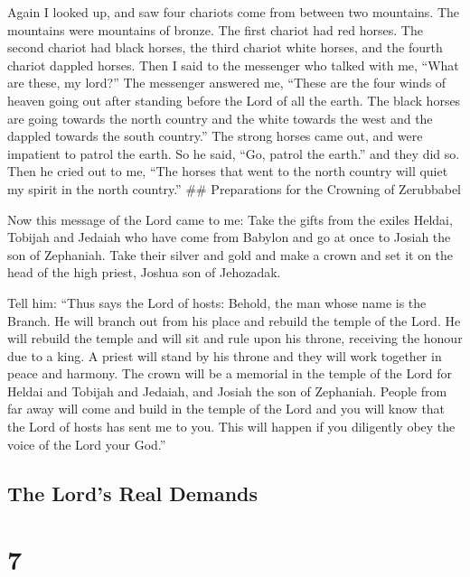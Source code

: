  Again I looked up, and saw four chariots come from between
two mountains. The mountains were mountains of bronze.  The
first chariot had red horses. The second chariot had black horses,
 the third chariot white horses, and the fourth chariot
dappled horses.  Then I said to the messenger who talked
with me, ``What are these, my lord?''  The messenger
answered me, ``These are the four winds of heaven going out after
standing before the Lord of all the earth.  The black horses
are going towards the north country and the white towards the west and
the dappled towards the south country.''  The strong horses
came out, and were impatient to patrol the earth. So he said, ``Go,
patrol the earth.'' and they did so.  Then he cried out to
me, ``The horses that went to the north country will quiet my spirit in
the north country.'' \#\# Preparations for the Crowning of Zerubbabel

 Now this message of the Lord came to me:  Take
the gifts from the exiles Heldai, Tobijah and Jedaiah who have come from
Babylon and go at once to Josiah the son of Zephaniah. 
Take their silver and gold and make a crown and set it on the head of
the high priest, Joshua son of Jehozadak.

 Tell him: ``Thus says the Lord of hosts: Behold, the man
whose name is the Branch. He will branch out from his place and rebuild
the temple of the Lord.  He will rebuild the temple and
will sit and rule upon his throne, receiving the honour due to a king. A
priest will stand by his throne and they will work together in peace and
harmony.  The crown will be a memorial in the temple of the
Lord for Heldai and Tobijah and Jedaiah, and Josiah the son of
Zephaniah.  People from far away will come and build in the
temple of the Lord and you will know that the Lord of hosts has sent me
to you. This will happen if you diligently obey the voice of the Lord
your God.''

\hypertarget{the-lords-real-demands}{%
\subsection{The Lord's Real Demands}\label{the-lords-real-demands}}

\hypertarget{section-6}{%
\section{7}\label{section-6}}

